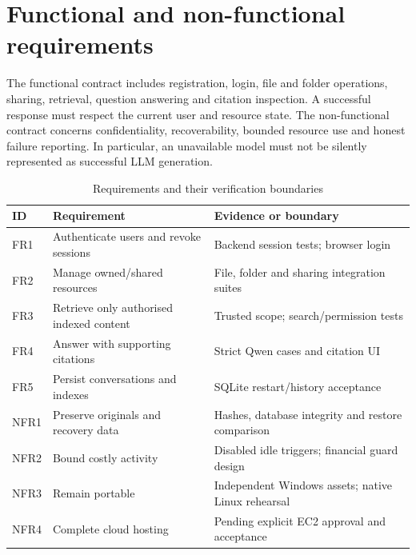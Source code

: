 \documentclass[11pt,a4paper,oneside]{report}
\begin{document}
\section{Functional and non-functional requirements}
The functional contract includes registration, login, file and folder operations, sharing, retrieval, question answering and citation inspection. A successful response must respect the current user and resource state. The non-functional contract concerns confidentiality, recoverability, bounded resource use and honest failure reporting. In particular, an unavailable model must not be silently represented as successful LLM generation.
\par\begin{table}[htbp]\caption{Requirements and their verification boundaries}\small\begin{tabularx}{\linewidth}{lYY}\toprule ID&Requirement&Evidence or boundary\\\midrule
FR1&Authenticate users and revoke sessions&Backend session tests; browser login\\
FR2&Manage owned/shared resources&File, folder and sharing integration suites\\
FR3&Retrieve only authorised indexed content&Trusted scope; search/permission tests\\
FR4&Answer with supporting citations&Strict Qwen cases and citation UI\\
FR5&Persist conversations and indexes&SQLite restart/history acceptance\\
NFR1&Preserve originals and recovery data&Hashes, database integrity and restore comparison\\
NFR2&Bound costly activity&Disabled idle triggers; financial guard design\\
NFR3&Remain portable&Independent Windows assets; native Linux rehearsal\\
NFR4&Complete cloud hosting&Pending explicit EC2 approval and acceptance\\\bottomrule\end{tabularx}\end{table}\par
\end{document}
